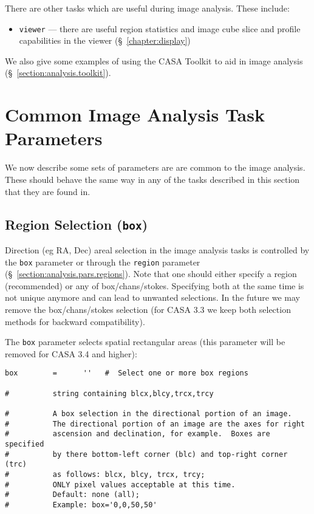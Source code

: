 There are other tasks which are useful during image analysis.  These
include:
\begin{itemize}
   \item {\tt viewer} --- there are useful region statistics and
         image cube slice and profile capabilities in the viewer 
         (\S~\ref{chapter:display})
\end{itemize}

We also give some examples of using the CASA Toolkit to aid in
image analysis (\S~\ref{section:analysis.toolkit}).

\section{Common Image Analysis Task Parameters}
\label{section:analysis.pars}

We now describe some sets of parameters are are common to the image
analysis.  These should behave the same way in any of the tasks
described in this section that they are found in.  

\subsection{Region Selection ({\tt box})}
\label{section:analysis.pars.box}

Direction (eg RA, Dec) areal selection in the image analysis tasks is
controlled by the {\tt box} parameter or through the {\tt region}
parameter (\S~\ref{section:analysis.pars.regions}). Note that one
should either specify a region (recommended) or any of
box/chans/stokes. Specifying both at the same time is not unique
anymore and can lead to unwanted selections. In the future we may
remove the box/chans/stokes selection (for CASA 3.3 we 
keep both selection methods for backward compatibility).

The {\tt box} parameter selects spatial rectangular areas (this parameter will
be removed for CASA 3.4 and higher):
\small
\begin{verbatim}
box        =      ''   #  Select one or more box regions

#          string containing blcx,blcy,trcx,trcy

#          A box selection in the directional portion of an image.
#          The directional portion of an image are the axes for right
#          ascension and declination, for example.  Boxes are specified
#          by there bottom-left corner (blc) and top-right corner (trc)
#          as follows: blcx, blcy, trcx, trcy;
#          ONLY pixel values acceptable at this time.
#          Default: none (all);
#          Example: box='0,0,50,50'


\end{verbatim}
\normalsize

